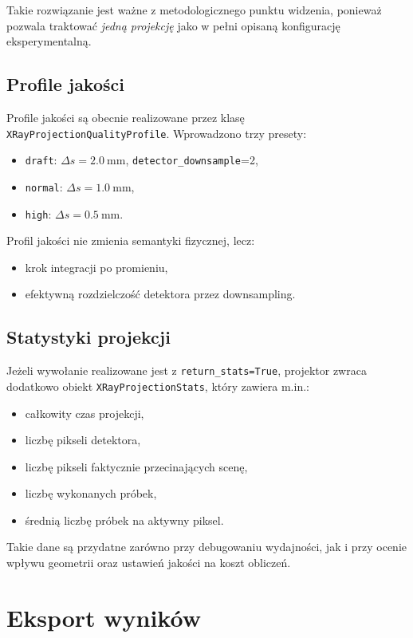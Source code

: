 \documentclass[12pt,a4paper]{article}
\begin{document}
Takie rozwiązanie jest ważne z metodologicznego punktu widzenia, ponieważ pozwala
traktować \emph{jedną projekcję} jako w pełni opisaną konfigurację eksperymentalną.

\subsection{Profile jakości}

Profile jakości są obecnie realizowane przez klasę
\texttt{XRayProjectionQualityProfile}. Wprowadzono trzy presety:
\begin{itemize}
  \item \texttt{draft}: \(\Delta s = 2.0\ \mathrm{mm}\), \texttt{detector\_downsample}=2,
  \item \texttt{normal}: \(\Delta s = 1.0\ \mathrm{mm}\),
  \item \texttt{high}: \(\Delta s = 0.5\ \mathrm{mm}\).
\end{itemize}

Profil jakości nie zmienia semantyki fizycznej, lecz:
\begin{itemize}
  \item krok integracji po promieniu,
  \item efektywną rozdzielczość detektora przez downsampling.
\end{itemize}

\subsection{Statystyki projekcji}

Jeżeli wywołanie realizowane jest z \texttt{return\_stats=True}, projektor zwraca
dodatkowo obiekt \texttt{XRayProjectionStats}, który zawiera m.in.:
\begin{itemize}
  \item całkowity czas projekcji,
  \item liczbę pikseli detektora,
  \item liczbę pikseli faktycznie przecinających scenę,
  \item liczbę wykonanych próbek,
  \item średnią liczbę próbek na aktywny piksel.
\end{itemize}

Takie dane są przydatne zarówno przy debugowaniu wydajności, jak i przy ocenie
wpływu geometrii oraz ustawień jakości na koszt obliczeń.

\section{Eksport wyników}
\end{document}
